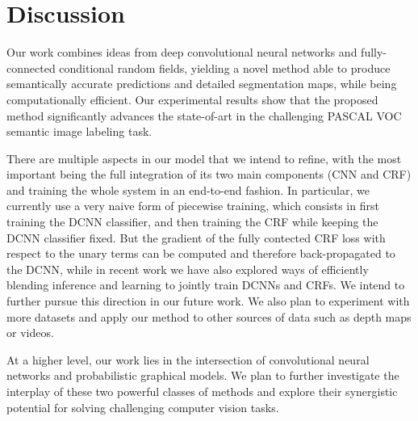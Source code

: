 \section{Discussion}
\label{sec:discussion}

Our work combines ideas from deep convolutional neural networks and
fully-connected conditional random fields, yielding a novel method able to
produce semantically accurate predictions and detailed segmentation maps,
while being computationally efficient. Our experimental results show that the
proposed method significantly advances the state-of-art in the challenging
PASCAL VOC semantic image labeling task.

There are multiple aspects in our model that we intend to refine, with the most important being the 
full integration of its two main components (CNN and CRF) and training the whole
system in an end-to-end fashion.  In particular, we currently use a very naive form of piecewise training, which consists in first training the DCNN classifier, and then training the CRF while keeping the DCNN classifier fixed. But  the gradient of the fully contected CRF loss  with respect to the unary terms can be computed \cite{Koltun13} and therefore
back-propagated to the DCNN, while in recent work \citet{chen2014learning} we have also explored ways of efficiently blending inference and learning to jointly train DCNNs and CRFs. We intend to further pursue this direction in our future work. 
We also plan to experiment with more datasets
and apply our method to other sources of data such as depth maps or videos.

At a higher level, our work lies in the intersection of convolutional neural
networks and probabilistic graphical models. We plan to further investigate
the interplay of these two powerful classes of methods and explore their
synergistic potential for solving challenging computer vision tasks.
